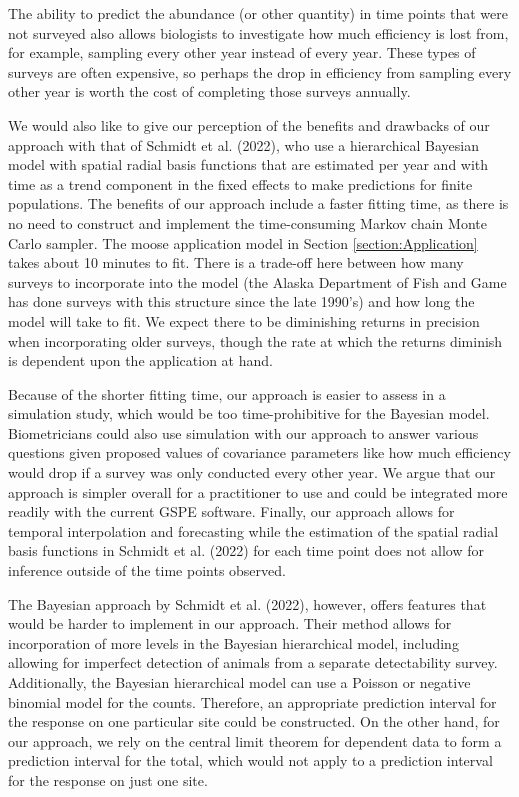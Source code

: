 \documentclass[smallextended]{svjour3}       %
\begin{document}
The ability to predict the abundance (or other quantity) in time points
that were not surveyed also allows biologists to investigate how much
efficiency is lost from, for example, sampling every other year instead
of every year. These types of surveys are often expensive, so perhaps
the drop in efficiency from sampling every other year is worth the cost
of completing those surveys annually.

We would also like to give our perception of the benefits and drawbacks
of our approach with that of Schmidt et al. (2022), who use a
hierarchical Bayesian model with spatial radial basis functions that are
estimated per year and with time as a trend component in the fixed
effects to make predictions for finite populations. The benefits of our
approach include a faster fitting time, as there is no need to construct
and implement the time-consuming Markov chain Monte Carlo sampler. The
moose application model in Section \ref{section:Application} takes about
10 minutes to fit. There is a trade-off here between how many surveys to
incorporate into the model (the Alaska Department of Fish and Game has
done surveys with this structure since the late 1990's) and how long the
model will take to fit. We expect there to be diminishing returns in
precision when incorporating older surveys, though the rate at which the
returns diminish is dependent upon the application at hand.

Because of the shorter fitting time, our approach is easier to assess in
a simulation study, which would be too time-prohibitive for the Bayesian
model. Biometricians could also use simulation with our approach to
answer various questions given proposed values of covariance parameters
like how much efficiency would drop if a survey was only conducted every
other year. We argue that our approach is simpler overall for a
practitioner to use and could be integrated more readily with the
current GSPE software. Finally, our approach allows for temporal
interpolation and forecasting while the estimation of the spatial radial
basis functions in Schmidt et al. (2022) for each time point does not
allow for inference outside of the time points observed.

The Bayesian approach by Schmidt et al. (2022), however, offers features
that would be harder to implement in our approach. Their method allows
for incorporation of more levels in the Bayesian hierarchical model,
including allowing for imperfect detection of animals from a separate
detectability survey. Additionally, the Bayesian hierarchical model can
use a Poisson or negative binomial model for the counts. Therefore, an
appropriate prediction interval for the response on one particular site
could be constructed. On the other hand, for our approach, we rely on
the central limit theorem for dependent data to form a prediction
interval for the total, which would not apply to a prediction interval
for the response on just one site.
\end{document}
